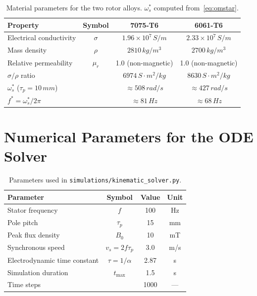 \documentclass[12pt, a4paper]{article}
\theoremstyle{plain}
\theoremstyle{definition}
\newcommand{\taup}{\tau_p}
\newcommand{\omstar}{\omega_s^*}
\newcommand{\sig}{\sigma}
\begin{document}
\begin{table}[h!]
  \centering
  \renewcommand{\arraystretch}{1.3}
  \begin{tabular}{lccc}
    \toprule
    \textbf{Property} & \textbf{Symbol} & \textbf{7075-T6} & \textbf{6061-T6}\\
    \midrule
    Electrical conductivity & $\sig$ & $1.96\times10^7\,\si{S/m}$ & $2.33\times10^7\,\si{S/m}$\\
    Mass density & $\rho$ & $2810\,\si{kg/m^3}$ & $2700\,\si{kg/m^3}$\\
    Relative permeability & $\mu_r$ & 1.0 (non-magnetic) & 1.0 (non-magnetic)\\
    $\sig/\rho$ ratio & & $6974\,\si{S\cdot m^2/kg}$ & $8630\,\si{S\cdot m^2/kg}$\\
    $\omstar$ ($\taup = 10\,\si{mm}$) & & $\approx 508\,\si{rad/s}$ & $\approx 427\,\si{rad/s}$\\
    $f^* = \omstar/2\pi$ & & $\approx 81\,\si{Hz}$ & $\approx 68\,\si{Hz}$\\
    \bottomrule
  \end{tabular}
  \caption{Material parameters for the two rotor alloys. $\omstar$ computed from~\eqref{eq:omstar}.}
\end{table}


\section{Numerical Parameters for the ODE Solver}
\label{app:ode_params}

\begin{table}[h!]
  \centering
  \renewcommand{\arraystretch}{1.3}
  \begin{tabular}{lccc}
    \toprule
    \textbf{Parameter} & \textbf{Symbol} & \textbf{Value} & \textbf{Unit}\\
    \midrule
    Stator frequency & $f$ & 100 & Hz\\
    Pole pitch & $\taup$ & 15 & mm\\
    Peak flux density & $B_0$ & 10 & mT\\
    Synchronous speed & $v_s = 2f\taup$ & 3.0 & m/s\\
    Electrodynamic time constant & $\tau = 1/\alpha$ & 2.87 & s\\
    Simulation duration & $t_{\max}$ & 1.5 & s\\
    Time steps & & 1000 & —\\
    \bottomrule
  \end{tabular}
  \caption{Parameters used in \texttt{simulations/kinematic\_solver.py}.}
\end{table}
\end{document}
